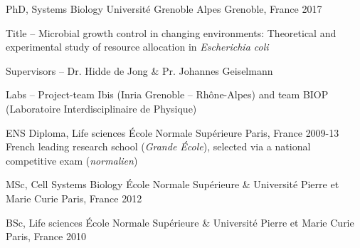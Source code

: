




\begin{cvhonors}
  \cvhonor
    {PhD, Systems Biology} %
    {Université Grenoble Alpes} %
    {Grenoble, France} %
    {2017} %
    {
    \begin{cvitems} %
    \item Title -- Microbial growth control in changing environments: Theoretical and experimental study of resource allocation in \textit{Escherichia coli}
    \item Supervisors -- Dr. Hidde de Jong \& Pr. Johannes Geiselmann
    \item Labs -- Project-team Ibis (Inria Grenoble – Rhône-Alpes) and team BIOP (Laboratoire Interdisciplinaire de Physique)
    \end{cvitems}
    }
    
  \cvhonor
    {ENS Diploma, Life sciences} %
    {École Normale Supérieure} %
    {Paris, France} %
    {2009-13} %
    {French leading research school (\textit{Grande École}), selected via a national competitive exam (\textit{normalien})} %
    
  \cvhonor
    {MSc, Cell Systems Biology} %
    {École Normale Supérieure \& Université Pierre et Marie Curie} %
    {Paris, France} %
    {2012} %
    {} %
    
  \cvhonor
    {BSc, Life sciences} %
    {École Normale Supérieure \& Université Pierre et Marie Curie} %
    {Paris, France} %
    {2010} %
    {} %
    


\end{cvhonors}    



